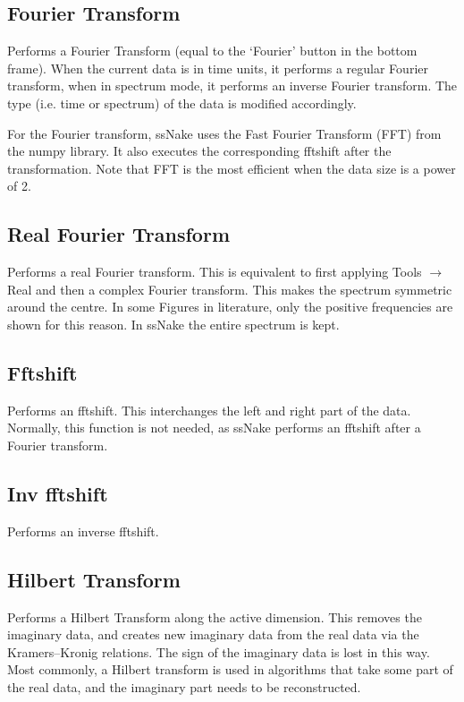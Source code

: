 \documentclass[11pt,a4paper]{article}
\begin{document}
\subsection{Fourier Transform}
Performs a Fourier Transform (equal to the `Fourier' button in the bottom frame).
When the current data is in time units, it performs a regular Fourier transform, when in spectrum mode, it performs an inverse Fourier transform.
The type (i.e. time or spectrum) of the data is modified accordingly.

For the Fourier transform, ssNake uses the Fast Fourier Transform (FFT) from the numpy library.
It also executes the corresponding fftshift after the transformation.
Note that FFT is the most efficient when the data size is a power of 2.


\subsection{Real Fourier Transform}
Performs a real Fourier transform.
This is equivalent to first applying Tools $\rightarrow$ Real and then a complex Fourier transform.
This makes the spectrum symmetric around the centre.
In some Figures in literature, only the positive frequencies are shown for this reason.
In ssNake the entire spectrum is kept.

\subsection{Fftshift}
Performs an fftshift. This interchanges the left and right part of the data.
Normally, this function is not needed, as ssNake performs an fftshift after a Fourier transform.

\subsection{Inv fftshift}
Performs an inverse fftshift.


\subsection{Hilbert Transform}
Performs a Hilbert Transform along the active dimension.
This removes the imaginary data, and creates new imaginary data from the real data via the Kramers--Kronig relations.
The sign of the imaginary data is lost in this way.
Most commonly, a Hilbert transform is used in algorithms that take some part of the real data, and the imaginary part needs to be reconstructed.
\end{document}
